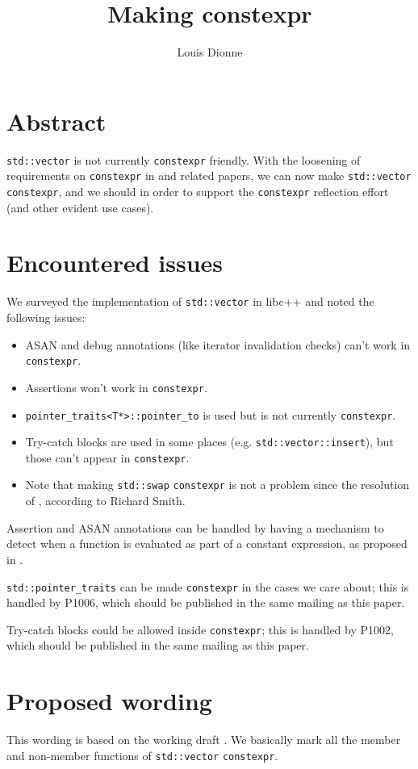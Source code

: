 \documentclass{wg21}
\title{Making \cc{std::vector} constexpr}
\author{Louis Dionne}{ldionne.2@gmail.com}
\newcommand{\cc}[1]{\texttt{#1}}
\begin{document}
\maketitle

\section{Abstract}
\cc{std::vector} is not currently \cc{constexpr} friendly. With the loosening
of requirements on \cc{constexpr} in \cite{P0784R1} and related papers, we
can now make \cc{std::vector} \cc{constexpr}, and we should in order to support
the \cc{constexpr} reflection effort (and other evident use cases).


\section{Encountered issues}
We surveyed the implementation of \cc{std::vector} in libc++ and noted the
following issues:
\begin{itemize}
  \item ASAN and debug annotations (like iterator invalidation checks) can't
        work in \cc{constexpr}.
  \item Assertions won't work in \cc{constexpr}.
  \item \cc{pointer_traits<T*>::pointer_to} is used but is not currently
        \cc{constexpr}.
  \item Try-catch blocks are used in some places (e.g. \cc{std::vector::insert}),
        but those can't appear in \cc{constexpr}.
  \item Note that making \cc{std::swap} \cc{constexpr} is not a problem since
        the resolution of \cite{P0859R0}, according to Richard Smith.
\end{itemize}

Assertion and ASAN annotations can be handled by having a mechanism to detect
when a function is evaluated as part of a constant expression, as proposed in
\cite{P0595R0}.

\cc{std::pointer_traits} can be made \cc{constexpr} in the cases we care about;
this is handled by P1006, which should be published in the same mailing as this
paper.

Try-catch blocks could be allowed inside \cc{constexpr}; this is handled by
P1002, which should be published in the same mailing as this paper.


\section{Proposed wording}
This wording is based on the working draft \cite{N4727}. We basically mark
all the member and non-member functions of \cc{std::vector} \cc{constexpr}.
\end{document}
